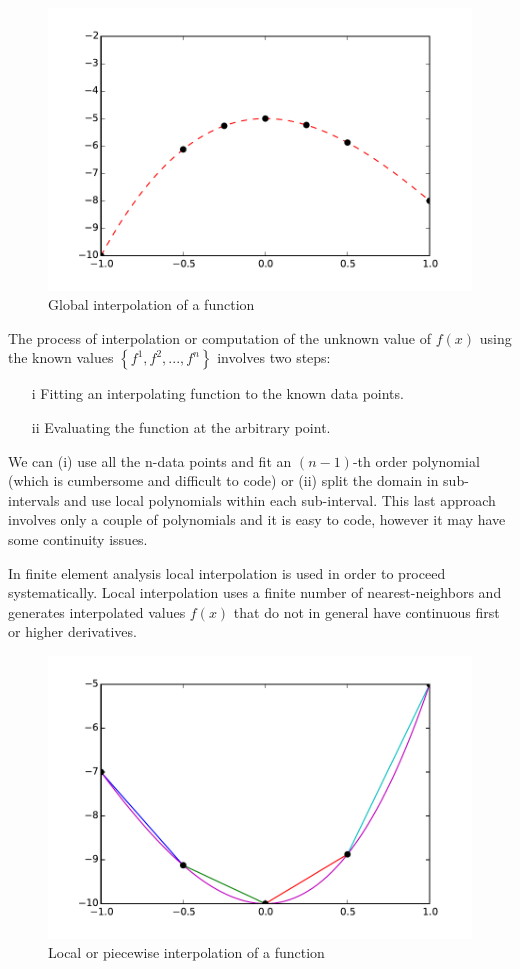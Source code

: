 \begin{figure}[h]
\centering
\includegraphics[width=12cm]{img/interpol1.pdf}
\caption{Global interpolation of a function}
\label{fig:interpol1}
\end{figure}

The process of interpolation or computation of the unknown value of $f(x)$ using the known values $\left\{ {{f^1},{f^2},...,{f^n}} \right\}$ involves two steps:

\begin{itemize}
\item[i]  Fitting an interpolating function to the known data points.
\item[ii] Evaluating the function at the arbitrary point.
\end{itemize}

We can (i) use all the n-data points and fit an $(n-1)$-th order polynomial (which is cumbersome and difficult to code) or (ii) split the domain in sub-intervals and use local polynomials within each sub-interval. This last approach involves only a couple of polynomials and it is easy to code, however it may have some continuity issues.

In finite element analysis local interpolation is used in order to proceed systematically. Local interpolation uses a finite number of nearest-neighbors and generates interpolated values $f(x)$ that do not in general have continuous first or higher derivatives.

\begin{figure}[h]
\centering
\includegraphics[width=12cm]{img/interpol2.pdf}
\caption{Local or piecewise interpolation of a function}
\label{fig:interpol2}
\end{figure}

